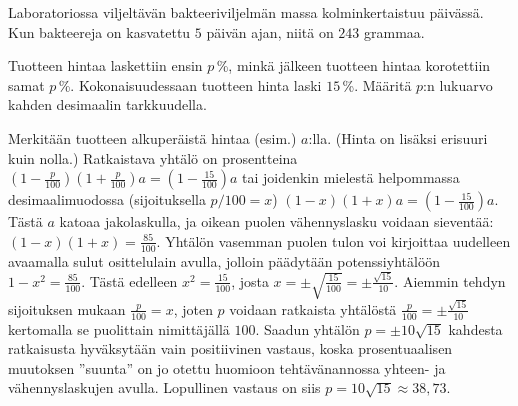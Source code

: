 \begin{tehtava}
	 Laboratoriossa viljeltävän bakteeriviljelmän massa kolminkertaistuu päivässä. Kun bakteereja on kasvatettu $5$ päivän ajan, niitä on $243$ grammaa. 
	 \begin{vastaus}
	 \end{vastaus}
\end{tehtava}

\begin{tehtava}
Tuotteen hintaa laskettiin ensin $p$\,\%, minkä jälkeen tuotteen hintaa korotettiin samat $p$\,\%. Kokonaisuudessaan tuotteen hinta laski $15$\,\%. Määritä $p$:n lukuarvo kahden desimaalin tarkkuudella.
	\begin{vastaus}
	Merkitään tuotteen alkuperäistä hintaa (esim.) $a$:lla. (Hinta on lisäksi erisuuri kuin nolla.) Ratkaistava yhtälö on prosentteina $(1-\frac{p}{100})(1+\frac{p}{100})a=(1-\frac{15}{100})a$ tai joidenkin mielestä helpommassa desimaalimuodossa (sijoituksella $p/100=x$) $(1-x)(1+x)a=(1-\frac{15}{100})a$. Tästä $a$ katoaa jakolaskulla, ja oikean puolen vähennyslasku voidaan sieventää: $(1-x)(1+x)=\frac{85}{100}$. Yhtälön vasemman puolen tulon voi kirjoittaa uudelleen avaamalla sulut osittelulain avulla, jolloin päädytään potenssiyhtälöön $1-x^2=\frac{85}{100}$. Tästä edelleen $x^2=\frac{15}{100}$, josta $x=\pm \sqrt{\frac{15}{100}}=\pm \frac{\sqrt{15}}{10}$. Aiemmin tehdyn sijoituksen mukaan $\frac{p}{100}=x$, joten $p$ voidaan ratkaista yhtälöstä $\frac{p}{100}=\pm \frac{\sqrt{15}}{10}$ kertomalla se puolittain nimittäjällä $100$. Saadun yhtälön $p=\pm 10\sqrt{15}$ kahdesta ratkaisusta hyväksytään vain positiivinen vastaus, koska prosentuaalisen muutoksen ''suunta'' on jo otettu huomioon tehtävänannossa yhteen- ja vähennyslaskujen avulla. Lopullinen vastaus on siis $p=10\sqrt{15}\approx 38,73$.
	\end{vastaus}
\end{tehtava}


\newpage